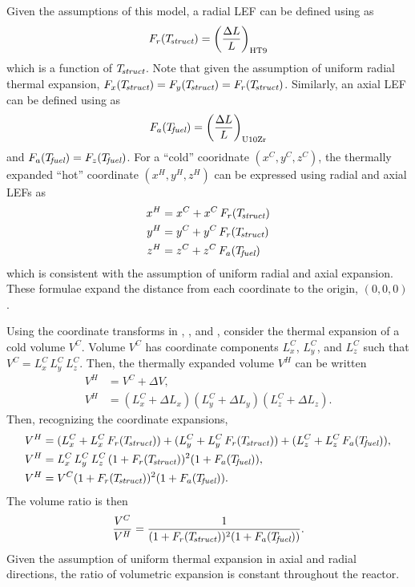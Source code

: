     Given the assumptions of this model, a radial LEF can be defined using 
     as
    \begin{equation}
      \label{eq:lef_r}
      F_r(T_{\!\mbox{\scriptsize \em struct}}) = \left(\frac{\Delta L}{L}\right)_{\text{HT9}}
    \end{equation}
    which is a function of $T_{\!\mbox{\scriptsize \em struct}}$. Note that given the assumption of 
    uniform radial thermal expansion, ${F_x(T_{\!\mbox{\scriptsize \em struct}}) = F_y(T_{\!\mbox{\scriptsize \em struct}}) =
    F_r(T_{\!\mbox{\scriptsize \em struct}})}$.
    Similarly, an axial LEF can be defined using  as 
    \begin{equation}
      \label{eq:lef_a}
      F_a({T_{\!\mbox{\scriptsize \em fuel}}}) = \left(\frac{\Delta L}{L}\right)_{\text{U10Zr}}
    \end{equation}
    and $F_a({T_{\!\mbox{\scriptsize \em fuel}}}) = F_z({T_{\!\mbox{\scriptsize \em fuel}}})$. For a ``cold'' cooridnate 
    $(x^C,y^C,z^C)$, the thermally expanded ``hot'' coordinate $(x^H,y^H,z^H)$ 
    can be expressed using radial and axial LEFs as
    \begin{align}
      \label{eq:expand_x}
      x^H &= x^C + x^C \, F_r(T_{\!\mbox{\scriptsize \em struct}}) \\
      \label{eq:expand_y}
      y^H &= y^C + y^C \, F_r(T_{\!\mbox{\scriptsize \em struct}}) \\
      \label{eq:expand_z}
      z^H &= z^C + z^C \, F_a({T_{\!\mbox{\scriptsize \em fuel}}})
    \end{align}
    which is consistent with the assumption of uniform radial and axial 
    expansion. These formulae expand the distance from each coordinate to the
    origin, $(0,0,0)$.

    Using the coordinate transforms in , , 
    and , consider the thermal expansion of a cold volume 
    $V^C$.  Volume $V^C$ has coordinate components $L_x^C$, $L_y^C$, and $L_z^C$
    such that ${V^C = L_x^C \, L_y^C \, L_z^C}$. Then, the thermally expanded 
    volume $V^H$ can be written
    \begin{align}
      V^H &= V^C + \Delta V, \\
      V^H &= (L_x^C + \Delta L_x) (L_y^C + \Delta L_y) (L_z^C + \Delta L_z). 
    \end{align}
    Then, recognizing the coordinate expansions,
    \begin{align}
      V^H &= (L_x^C + L_x^C \, F_r(T_{\!\mbox{\scriptsize \em struct}})) + 
        (L_y^C + L_y^C \, F_r(T_{\!\mbox{\scriptsize \em struct}})) + 
        (L_z^C + L_z^C \, F_a({T_{\!\mbox{\scriptsize \em fuel}}})), \\
      V^H &= L_x^C \, L_y^C \, L_z^C \, (1 + F_r(T_{\!\mbox{\scriptsize \em struct}}))^2
        (1+F_a({T_{\!\mbox{\scriptsize \em fuel}}})), \\
      V^H &= V^C (1 + F_r(T_{\!\mbox{\scriptsize \em struct}}))^2 (1+F_a({T_{\!\mbox{\scriptsize \em fuel}}})).
    \end{align}
    The volume ratio is then
    \begin{equation}
      \label{eq:volume_ratio}
      \frac{V^C}{V^H} = \frac{1}{(1+F_r(T_{\!\mbox{\scriptsize \em struct}}))^2 (1+F_a({T_{\!\mbox{\scriptsize \em fuel}}}))}.
    \end{equation}
    Given the assumption of uniform thermal expansion in axial and radial
    directions, the ratio of volumetric expansion is constant throughout the
    reactor.

